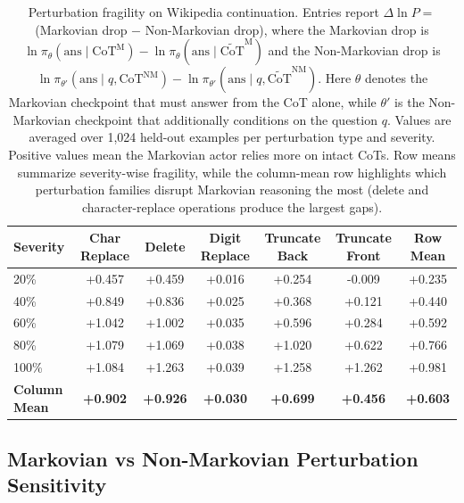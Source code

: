 \documentclass{article} %
\begin{document}
\begin{table}[ht]
    \setlength{\tabcolsep}{3pt}
  \centering
\small
\begin{tabular}{lcccccc}
\toprule
\textbf{Severity} & \textbf{Char Replace} & \textbf{Delete} & \textbf{Digit Replace} & \textbf{Truncate Back} & \textbf{Truncate Front} & \textbf{Row Mean} \\
\midrule
20\%  & +0.457 & +0.459 & +0.016 & +0.254 & -0.009 & +0.235 \\
40\%  & +0.849 & +0.836 & +0.025 & +0.368 & +0.121 & +0.440 \\
60\%  & +1.042 & +1.002 & +0.035 & +0.596 & +0.284 & +0.592 \\
80\%  & +1.079 & +1.069 & +0.038 & +1.020 & +0.622 & +0.766 \\
100\% & +1.084 & +1.263 & +0.039 & +1.258 & +1.262 & +0.981 \\
\midrule
\rowcolor{black!10}\textbf{Column Mean} & \textbf{+0.902} & \textbf{+0.926} & \textbf{+0.030} & \textbf{+0.699} & \textbf{+0.456} & \textbf{+0.603} \\
\bottomrule
\end{tabular}
\caption{Perturbation fragility on Wikipedia continuation. Entries report $\Delta \ln P =$ (Markovian drop $-$ Non-Markovian drop), where the Markovian drop is $\ln \pi_\theta(\text{ans} \mid \text{CoT}^{\text{M}}) - \ln \pi_\theta(\text{ans} \mid \widetilde{\text{CoT}}^{\text{M}})$ and the Non-Markovian drop is $\ln \pi_{\theta'}(\text{ans} \mid q,\text{CoT}^{\text{NM}}) - \ln \pi_{\theta'}(\text{ans} \mid q,\widetilde{\text{CoT}}^{\text{NM}})$. Here $\theta$ denotes the Markovian checkpoint that must answer from the CoT alone, while $\theta'$ is the Non-Markovian checkpoint that additionally conditions on the question $q$. Values are averaged over 1{,}024 held-out examples per perturbation type and severity. Positive values mean the Markovian actor relies more on intact CoTs. Row means summarize severity-wise fragility, while the column-mean row highlights which perturbation families disrupt Markovian reasoning the most (delete and character-replace operations produce the largest gaps).}
\label{tab:markovian_comparison}
\end{table}


\subsection{Markovian vs Non-Markovian Perturbation Sensitivity}\label{subsec:markovian_sensitivity}
\end{document}
